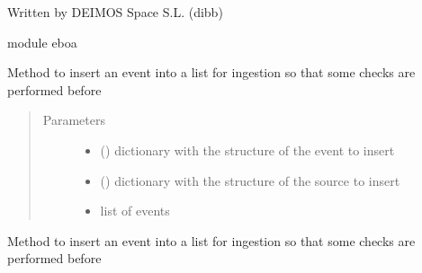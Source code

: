 Written by DEIMOS Space S.L. (dibb)

module eboa

\begin{fulllineitems}
\label{\detokenize{eboa.engine:eboa.engine.ingestion.insert_event_for_ingestion}}
Method to insert an event into a list for ingestion so that some checks are performed before
\begin{quote}\begin{description}
\item[{Parameters}] \leavevmode\begin{itemize}
\item {} 
 () \textendash{} dictionary with the structure of the event to insert

\item {} 
 () \textendash{} dictionary with the structure of the source to insert

\item {} 
 \textendash{} list of events

\end{itemize}

\end{description}\end{quote}

\end{fulllineitems}


\begin{fulllineitems}
\label{\detokenize{eboa.engine:eboa.engine.ingestion.remove_namespaces}}
Method to insert an event into a list for ingestion so that some checks are performed before

\end{fulllineitems}



